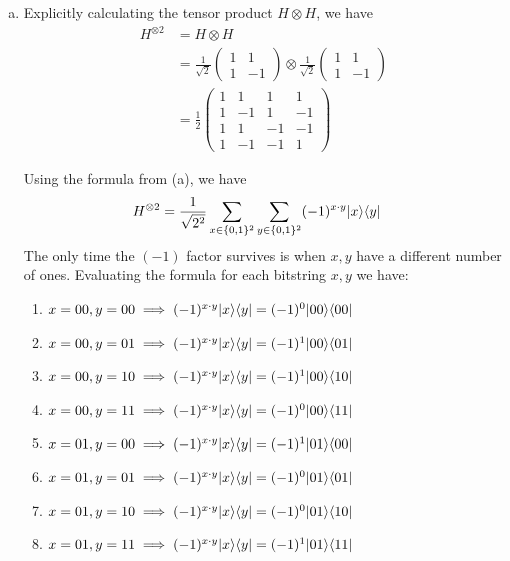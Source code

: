\documentclass[11pt]{article}
\begin{document}
\begin{enumerate}[(a).]
  \item Explicitly calculating the tensor product $H \otimes H$, we have
  \begin{align*}
    H^{\otimes 2} &= H \otimes H \\
    &= \frac{1}{\sqrt{2}} \begin{pmatrix}
      1 & 1 \\
      1 & -1
    \end{pmatrix} \otimes \frac{1}{\sqrt{2}} \begin{pmatrix}
      1 & 1 \\
      1 & -1
    \end{pmatrix} \\
    &= \frac{1}{2} \begin{pmatrix}
      1 & 1 & 1 & 1 \\
      1 & -1 & 1 & -1 \\
      1 & 1 & -1 & -1 \\
      1 & -1 & -1 & 1 
    \end{pmatrix}
  \end{align*}

  Using the formula from (a), we have
  \begin{align*}
    H^{\otimes 2} &= \frac{1}{\sqrt{2^2}} \sum_{x \in \{0, 1\}^2} \sum_{y \in \{0, 1\}^2} (-1)^{x \cdot y} \lvert x\rangle \langle y\rvert 
  \end{align*} The only time the $(-1)$ factor survives is when $x, y$ have a different number of ones. Evaluating the formula for each bitstring $x, y$ we have:

  \begin{enumerate}[1.]
    \item $x = 00, y = 00 \implies (-1)^{x \cdot y} \lvert x\rangle \langle y\rvert = (-1)^0 \lvert00\rangle \langle00\rvert$
    \item $x = 00, y = 01 \implies (-1)^{x \cdot y} \lvert x\rangle \langle y\rvert = (-1)^1 \lvert00\rangle \langle01\rvert$
    \item $x = 00, y = 10 \implies (-1)^{x \cdot y} \lvert x\rangle \langle y\rvert = (-1)^1 \lvert00\rangle \langle10\rvert$
    \item $x = 00, y = 11 \implies (-1)^{x \cdot y} \lvert x\rangle \langle y\rvert = (-1)^0 \lvert00\rangle \langle11\rvert$
    
    \item $x = 01, y = 00 \implies (-1)^{x \cdot y} \lvert x\rangle \langle y\rvert = (-1)^{1} \lvert01\rangle \langle00\rvert$
    \item $x = 01, y = 01 \implies (-1)^{x \cdot y} \lvert x\rangle \langle y\rvert = (-1)^{0} \lvert01\rangle \langle01\rvert$
    \item $x = 01, y = 10 \implies (-1)^{x \cdot y} \lvert x\rangle \langle y\rvert = (-1)^{0} \lvert01\rangle \langle10\rvert$
    \item $x = 01, y = 11 \implies (-1)^{x \cdot y} \lvert x\rangle \langle y\rvert = (-1)^{1} \lvert01\rangle \langle11\rvert$
    

\end{enumerate}
\end{enumerate}
\end{document}
